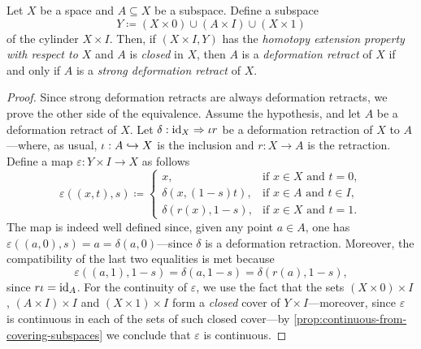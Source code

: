 \begin{theorem}
    \label{thm:deformation-retract-iff-strong-deformation-retract}
    Let \(X\) be a space and \(A \subseteq X\) be a subspace. Define a subspace
    \[
        Y \coloneq (X \times 0) \cup (A \times I) \cup (X \times 1)
    \]
    of the cylinder \(X \times I\). Then, if \((X \times I, Y)\) has the
    \emph{homotopy extension property with respect to \(X\)} and \(A\) is
    \emph{closed} in \(X\), then \(A\) is a \emph{deformation retract} of \(X\) if
    and only if \(A\) is a \emph{strong deformation retract} of \(X\).
\end{theorem}

\begin{proof}
    Since strong deformation retracts are always deformation retracts, we prove the
    other side of the equivalence. Assume the hypothesis, and let \(A\) be a
    deformation retract of \(X\). Let \(\delta: \operatorname{id}_X \Rightarrow \iota r\) be a
    deformation retraction of \(X\) to \(A\)---where, as usual, \(\iota: A \hookrightarrow X\)
    is the inclusion and \(r: X \to A\) is the retraction. Define a map
    \(\varepsilon: Y \times I \to X\) as follows
    \[
        \varepsilon((x, t), s) \coloneq
        \begin{cases}
            x,                   & \text{if } x \in X \text{ and } t = 0,   \\
            \delta(x, (1-s)t),   & \text{if } x \in A \text{ and } t \in I, \\
            \delta(r(x), 1 - s), & \text{if } x \in X \text{ and } t = 1.
        \end{cases}
    \]
    The map is indeed well defined since, given any point \(a \in A\), one has
    \(\varepsilon((a, 0), s) = a = \delta(a, 0)\)---since \(\delta\) is a
    deformation retraction. Moreover, the compatibility of the last two equalities
    is met because
    \[
        \varepsilon((a, 1), 1 - s) = \delta(a, 1 - s) = \delta(r(a), 1 - s),
    \]
    since \(r \iota = \operatorname{id}_A\). For the continuity of \(\varepsilon\), we use the
    fact that the sets \((X \times 0) \times I\), \((A \times I) \times I\) and
    \((X \times 1) \times I\) form a \emph{closed} cover of
    \(Y \times I\)---moreover, since \(\varepsilon\) is continuous in each of the
    sets of such closed cover---by \cref{prop:continuous-from-covering-subspaces} we
    conclude that \(\varepsilon\) is continuous.


\end{proof}
